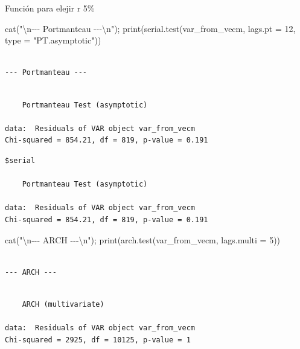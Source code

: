 \documentclass[
  spanish,
  letterpaper,
  DIV=11,
  numbers=noendperiod]{scrartcl}
\newenvironment{Shaded}{\begin{snugshade}}{\end{snugshade}}
\newcommand{\AttributeTok}[1]{\textcolor[rgb]{0.40,0.45,0.13}{#1}}
\newcommand{\DecValTok}[1]{\textcolor[rgb]{0.68,0.00,0.00}{#1}}
\newcommand{\FunctionTok}[1]{\textcolor[rgb]{0.28,0.35,0.67}{#1}}
\newcommand{\NormalTok}[1]{\textcolor[rgb]{0.00,0.23,0.31}{#1}}
\newcommand{\SpecialCharTok}[1]{\textcolor[rgb]{0.37,0.37,0.37}{#1}}
\newcommand{\StringTok}[1]{\textcolor[rgb]{0.13,0.47,0.30}{#1}}
\begin{document}
Función para elejir r 5\%

\begin{Shaded}
\begin{Highlighting}[]
\FunctionTok{cat}\NormalTok{(}\StringTok{"}\SpecialCharTok{\textbackslash{}n}\StringTok{{-}{-}{-} Portmanteau {-}{-}{-}}\SpecialCharTok{\textbackslash{}n}\StringTok{"}\NormalTok{); }\FunctionTok{print}\NormalTok{(}\FunctionTok{serial.test}\NormalTok{(var\_from\_vecm, }\AttributeTok{lags.pt =} \DecValTok{12}\NormalTok{, }\AttributeTok{type =} \StringTok{"PT.asymptotic"}\NormalTok{))}
\end{Highlighting}
\end{Shaded}

\begin{verbatim}

--- Portmanteau ---
\end{verbatim}

\begin{verbatim}

    Portmanteau Test (asymptotic)

data:  Residuals of VAR object var_from_vecm
Chi-squared = 854.21, df = 819, p-value = 0.191
\end{verbatim}

\begin{verbatim}
$serial

    Portmanteau Test (asymptotic)

data:  Residuals of VAR object var_from_vecm
Chi-squared = 854.21, df = 819, p-value = 0.191
\end{verbatim}

\begin{Shaded}
\begin{Highlighting}[]
\FunctionTok{cat}\NormalTok{(}\StringTok{"}\SpecialCharTok{\textbackslash{}n}\StringTok{{-}{-}{-} ARCH {-}{-}{-}}\SpecialCharTok{\textbackslash{}n}\StringTok{"}\NormalTok{); }\FunctionTok{print}\NormalTok{(}\FunctionTok{arch.test}\NormalTok{(var\_from\_vecm, }\AttributeTok{lags.multi =} \DecValTok{5}\NormalTok{))}
\end{Highlighting}
\end{Shaded}

\begin{verbatim}

--- ARCH ---
\end{verbatim}

\begin{verbatim}

    ARCH (multivariate)

data:  Residuals of VAR object var_from_vecm
Chi-squared = 2925, df = 10125, p-value = 1
\end{verbatim}
\end{document}
